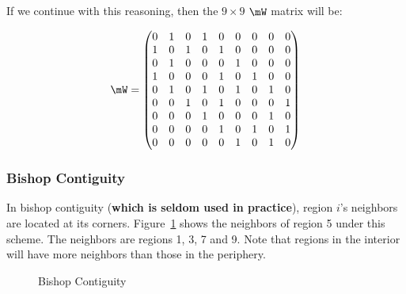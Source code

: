 \documentclass[english,12pt]{book}\usepackage[]{graphicx}\usepackage[]{xcolor}
\begin{document}
If we continue with this reasoning, then the $9\times 9$ $\mW$ matrix will be:

\begin{equation}
  \mW = 
  \begin{pmatrix}
     0 & 1 & 0 & 1 & 0 & 0 & 0 & 0 & 0 \\
     1 & 0 & 1 & 0 & 1 & 0 & 0 & 0 & 0 \\
     0 & 1 & 0 & 0 & 0 & 1 & 0 & 0 & 0 \\
     1 & 0 & 0 & 0 & 1 & 0 & 1 & 0 & 0 \\
     0 & 1 & 0 & 1 & 0 & 1 & 0 & 1 & 0 \\
     0 & 0 & 1 & 0 & 1 & 0 & 0 & 0 & 1 \\
     0 & 0 & 0 & 1 & 0 & 0 & 0 & 1 & 0 \\
     0 & 0 & 0 & 0 & 1 & 0 & 1 & 0 & 1 \\
     0 & 0 & 0 & 0 & 0 & 1 & 0 & 1 & 0 \\
  \end{pmatrix}
\end{equation}

\subsubsection{Bishop Contiguity}

In bishop contiguity (\textbf{which is seldom used in practice}), region $i$'s neighbors are located at its corners. Figure~\ref{fig:Bishop_cont_grid} shows the neighbors of region 5 under this scheme. The neighbors are regions 1, 3, 7 and 9. Note that regions in the interior will have more neighbors than those in the periphery. 


\begin{figure}[h]
\caption{Bishop Contiguity}
\label{fig:Bishop_cont_grid}
\centering
{}
\end{figure}
\end{document}
